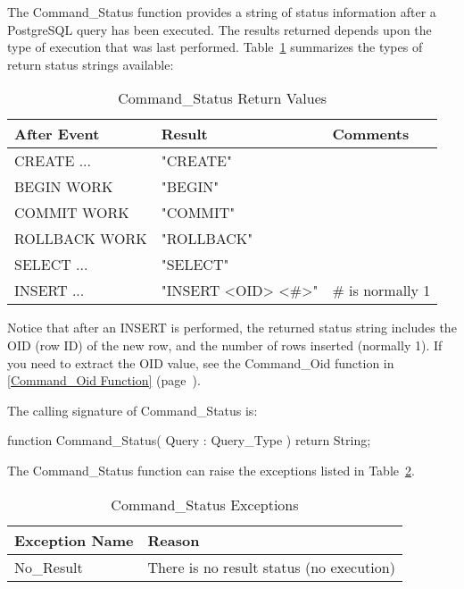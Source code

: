 \documentclass[english,letterpaper]{book}
\newcommand\Ref[1]{\textsection\ref{#1} (page~\pageref{#1})}
\begin{document}
The Command\_Status function provides a string of status information
after a PostgreSQL query has been executed. The results returned depends
upon the type of execution that was last performed. Table~\ref{t:csrv}
summarizes the types of return status strings available:%

\begin{table}
   \begin{center}
      \begin{tabular}{|l|l|l|}
         \hline
         After Event    &  Result               &  Comments\\
         \hline
         CREATE ...     &  "CREATE"             &  \\
         BEGIN WORK     &  "BEGIN"              &  \\
         COMMIT WORK    &  "COMMIT"             &  \\
         ROLLBACK WORK  &  "ROLLBACK"           &  \\
         SELECT ...     &  "SELECT"             &  \\
         INSERT ...     &  "INSERT <OID> <\#>"  &  \# is normally 1\\
         \hline
      \end{tabular}
   \end{center}
   \caption{Command\_Status Return Values}\label{t:csrv}
\end{table}

Notice that after an INSERT is performed, the returned status string
includes the OID (row ID) of the new row, and the number of rows inserted
(normally 1). If you need to extract the OID value, see the Command\_Oid
function in \Ref{Command_Oid Function}.

The calling signature of Command\_Status is:

\begin{Code}
function Command_Status(
   Query : Query_Type
) return String;
\end{Code}

The Command\_Status function can raise the exceptions listed in
Table~\ref{t:cstsx}.

\begin{table}
   \begin{center}
      \begin{tabular}{ll}
         Exception Name    &  Reason\\
         \hline 
         No\_Result        &  There is no result status (no execution)\\
      \end{tabular}
   \end{center}
   \caption{Command\_Status Exceptions}\label{t:cstsx}
\end{table}
\end{document}
